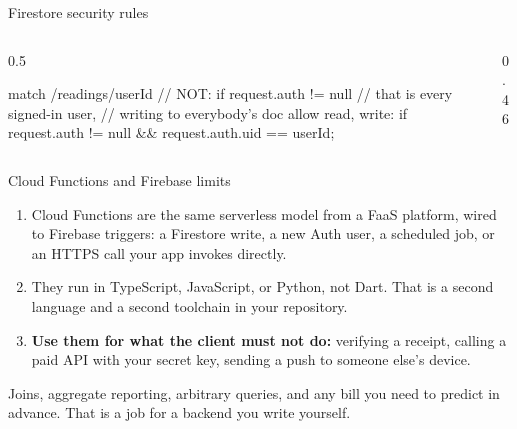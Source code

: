 \documentclass[10pt,aspectratio=169,t]{beamer}
\begin{document}
\begin{frame}[fragile,eyebrow=Firebase]{Firestore security rules}
  \begin{columns}[T]
    \begin{column}{0.5\textwidth}
\begin{codeblock}
match /readings/{userId} {
  // NOT: if request.auth != null
  // that is every signed-in user,
  // writing to everybody's doc
  allow read, write: if
    request.auth != null &&
    request.auth.uid == userId;
}
\end{codeblock}
    \end{column}
    \begin{column}{0.46\textwidth}
    \end{column}
  \end{columns}
\end{frame}

\begin{frame}[eyebrow=Firebase]{Cloud Functions and Firebase limits}
  \vskip 1mm
  \begin{enumerate}
    \item Cloud Functions are the same serverless model from a FaaS platform, wired to Firebase triggers: a Firestore write, a new Auth user, a scheduled job, or an HTTPS call your app invokes directly.
    \item They run in TypeScript, JavaScript, or Python, not Dart. That is a second language and a second toolchain in your repository.
    \item \textbf{Use them for what the client must not do:} verifying a receipt, calling a paid API with your secret key, sending a push to someone else's device.
  \end{enumerate}
  \begin{hint}
    Joins, aggregate reporting, arbitrary queries, and any bill you need to predict in advance. That is a job for a backend you write yourself.
  \end{hint}
\end{frame}
\end{document}
